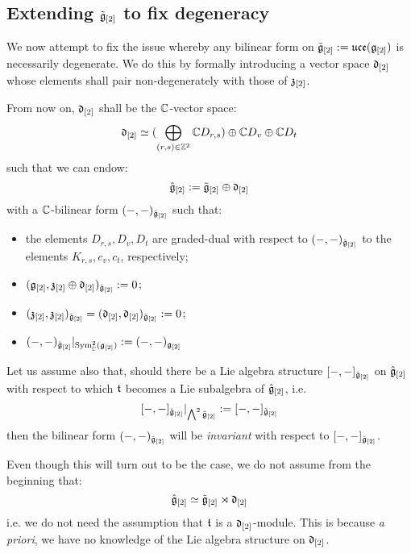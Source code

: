     \subsection{Extending \texorpdfstring{$\tilde{\mathfrak{g}}_{[2]}$}{} to fix degeneracy} \label{subsection: extended_toroidal_lie_algebras}
        We now attempt to fix the issue whereby any bilinear form on $\tilde{\mathfrak{g}}_{[2]}:= \mathfrak{uce}(\mathfrak{g}_{[2]})$ is necessarily degenerate. We do this by formally introducing a  vector space $\mathfrak{d}_{[2]}$ whose elements shall pair non-degenerately with those of $\mathfrak{z}_{[2]}$. 
        \begin{convention} \label{conv: orthogonal_complement_of_toroidal_centres}
            From now on, $\mathfrak{d}_{[2]}$ shall be the $\mathbb{C}$-vector space:
                $$\mathfrak{d}_{[2]} \simeq ( \bigoplus_{(r, s) \in \mathbb{Z}^2} \mathbb{C} D_{r, s} ) \oplus \mathbb{C} D_v \oplus \mathbb{C} D_t$$
            such that we can endow:
                $$\hat{\mathfrak{g}}_{[2]} := \tilde{\mathfrak{g}}_{[2]}\oplus \mathfrak{d}_{[2]}$$
            with a $\mathbb{C}$-bilinear form $(-, -)_{\hat{\mathfrak{g}}_{[2]}}$ such that:
            \begin{itemize}
                \item the elements $D_{r, s}, D_v, D_t$ are graded-dual with respect to $(-, -)_{\hat{\mathfrak{g}}_{[2]}}$ to the elements $K_{r, s}, c_v, c_t$, respectively;
                \item $(\mathfrak{g}_{[2]}, \mathfrak{z}_{[2]} \oplus \mathfrak{d}_{[2]})_{\hat{\mathfrak{g}}_{[2]}} := 0$;
                \item $(\mathfrak{z}_{[2]}, \mathfrak{z}_{[2]})_{\hat{\mathfrak{g}}_{[2]}} = (\mathfrak{d}_{[2]}, \mathfrak{d}_{[2]})_{\hat{\mathfrak{g}}_{[2]}} := 0$;
                \item $(-, -)_{\hat{\mathfrak{g}}_{[2]}}|_{\mathrm{Sym}^2_{\mathbb{C}}(\mathfrak{g}_{[2]})} := (-, -)_{\mathfrak{g}_{[2]}}$
            \end{itemize}
        \end{convention}
        \begin{convention}
            Let us assume also that, should there be a Lie algebra structure $[-, -]_{\hat{\mathfrak{g}}_{[2]}}$ on $\hat{\mathfrak{g}}_{[2]}$ with respect to which $\mathfrak{t}$ becomes a Lie subalgebra of $\hat{\mathfrak{g}}_{[2]}$, i.e.
                $$[-, -]_{\hat{\mathfrak{g}}_{[2]}}|_{\bigwedge^2 \tilde{\mathfrak{g}}_{[2]}} := [-, -]_{\tilde{\mathfrak{g}}_{[2]}}$$
            then the bilinear form $(-, -)_{\hat{\mathfrak{g}}_{[2]}}$ will be \textit{invariant} with respect to $[-, -]_{\hat{\mathfrak{g}}_{[2]}}$.

            Even though this will turn out to be the case, we do not assume from the beginning that:
                $$\hat{\mathfrak{g}}_{[2]} \simeq \tilde{\mathfrak{g}}_{[2]}\rtimes \mathfrak{d}_{[2]}$$
            i.e. we do not need the assumption that $\mathfrak{t}$ is a $\mathfrak{d}_{[2]}$-module. This is because \textit{a priori}, we have no knowledge of the Lie algebra structure on $\mathfrak{d}_{[2]}$.
        \end{convention}

